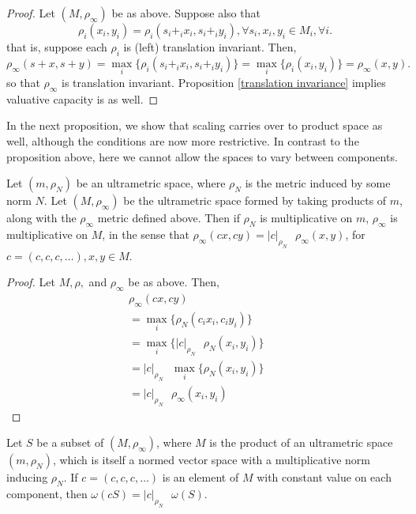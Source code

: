 \begin{proof}
Let $(M,\rho_\infty)$ be as above. Suppose also that \[\rho_i(x_i,y_i) = \rho_i(s_i +_i x_i, s_i +_iy_i), \forall s_i, x_i, y_i \in M_i, \forall i.\] that is, suppose each $\rho_i$ is (left) translation invariant. Then,  
\[
\rho_\infty(s +x, s+y)  
= \max_i\{\rho_i(s_i +_ix_i, s_i +_i y_i)\} 
= \max_i\{\rho_i(x_i, y_i)\}
= \rho_\infty(x,y).
\] so that $\rho_\infty$ is translation invariant.  Proposition \ref{translation invariance} implies valuative capacity is as well. 
\end{proof}

In the next proposition, we show that scaling carries over to product space as well, although the conditions are now more restrictive. In contrast to the proposition above, here  we cannot allow the spaces to vary between components.\\

\begin{proposition}
Let $(m, \rho_N)$ be an ultrametric space, where $\rho_N$ is the metric induced by some norm $N$. Let $(M, \rho_{\infty})$ be the ultrametric space formed by taking products of $m$, along with the $\rho_\infty$ metric defined above.  Then if $\rho_N$ is multiplicative on $m$, $\rho_{\infty}$ is multiplicative on $M$, in the sense that $\rho_{\infty}(cx,cy) = \lvert c\rvert_{\rho_N} \text{ } \rho_\infty (x,y)$, for $c=(c,c,c,\ldots), x,y \in M$.
\end{proposition}

\begin{proof}
Let $M, \rho,$ and $\rho_{\infty}$ be as above. Then, 
\begin{align*}
\rho_\infty(cx, cy) && \\
= \max_i\{\rho_N(c_i x_i, c_i y_i)\} && \\
= \max_i\{\vert c \rvert_{\rho_N} \text{ }  \rho_N(x_i, y_i)\} && \\
= \vert c \rvert_{\rho_N} \text{ } \max_i\{\rho_N(x_i,y_i)\} && \\
= \vert c \rvert_{\rho_N} \text{ } \rho_\infty(x_i,y_i)
\end{align*}
\end{proof}

\begin{corollary}
Let $S$ be a subset of $(M, \rho_\infty)$, where $M$ is the product of an ultrametric space $(m, \rho_N)$, which is itself a normed vector space with a multiplicative norm inducing $\rho_N$. If $c=(c,c,c,\ldots)$ is an element of $M$ with constant value on each component, then $\omega(cS)=\lvert c \rvert_{\rho_N} \text{ }\omega(S)$.
\end{corollary}

